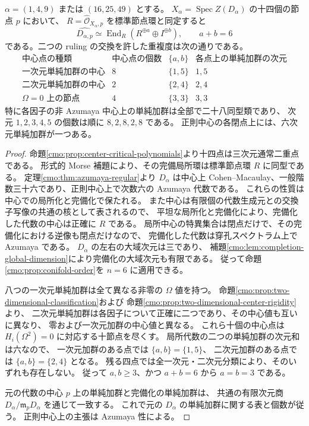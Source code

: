 \begin{theorem}
\label{cmo:thm:fourteen-node-orders}
$\alpha=(1,4,9)$ または $(16,25,49)$ とする。
$X_\alpha=\operatorname{Spec}Z(D_\alpha)$ の十四個の節点 $p$ において、
$R=\widehat{\mathcal O}_{X_\alpha,p}$ を標準節点環と同定すると
\[
 \widehat{D_{\alpha,p}}
 \simeq\operatorname{End}_R(R^{\oplus a}\oplus I^{\oplus b}),\qquad a+b=6
\]
である。二つの ruling の交換を許した重複度は次の通りである。
\[
\begin{array}{c|c|c|c}
 \text{中心点の種類}&\text{中心点の個数}&\{a,b\}
 &\text{各点上の単純加群の次元}\\\hline
 \text{一次元単純加群の中心}&8&\{1,5\}&1,5\\
 \text{二次元単純加群の中心}&2&\{2,4\}&2,4\\
 \Omega=0\text{ 上の節点}&4&\{3,3\}&3,3
\end{array}
\]
特に各因子の非 Azumaya 中心上の単純加群は全部で二十八同型類であり、
次元 $1,2,3,4,5$ の個数は順に $8,2,8,2,8$ である。
正則中心の各閉点上には、六次元単純加群が一つある。
\end{theorem}

\begin{proof}
命題\ref{cmo:prop:center-critical-polynomials}より十四点は三次元通常二重点である。
形式的 Morse 補題により、その完備局所環は標準節点環 $R$ に同型である。
定理\ref{cmo:thm:azumaya-regular}より $D_\alpha$ は中心上
Cohen--Macaulay、一般階数三十六であり、正則中心上で次数六の Azumaya 代数である。
これらの性質は中心での局所化と完備化で保たれる。
また中心は有限個の代数生成元との交換子写像の共通の核として表されるので、
平坦な局所化と完備化により、完備化した代数の中心は正確に $R$ である。
局所中心の特異集合は閉点だけで、その完備化における逆像も閉点だけなので、
完備化した代数は穿孔スペクトラム上で Azumaya である。
$D_\alpha$ の左右の大域次元は三であり、
補題\ref{cmo:lem:completion-global-dimension}により完備化の大域次元も有限である。
従って命題\ref{cmo:prop:conifold-order}を $n=6$ に適用できる。

八つの一次元単純加群は全て異なる非零の $\Omega$ 値を持つ。
命題\ref{cmo:prop:two-dimensional-classification}および
命題\ref{cmo:prop:two-dimensional-center-rigidity}より、
二次元単純加群は各因子について正確に二つであり、その中心値も互いに異なり、
零および一次元加群の中心値と異なる。
これら十個の中心点は $H_i(\Omega^2)=0$ に対応する十節点を尽くす。
局所代数の二つの単純加群の次元和は六なので、
一次元加群のある点では $\{a,b\}=\{1,5\}$、
二次元加群のある点では $\{a,b\}=\{2,4\}$ となる。
残る四点では全一次元・二次元分類により、そのいずれも存在しない。
従って $a,b\ge3$、かつ $a+b=6$ から $a=b=3$ である。

元の代数の中心 $p$ 上の単純加群と完備化の単純加群は、
共通の有限次元商 $D_\alpha/\mathfrak m_pD_\alpha$ を通じて一致する。
これで元の $D_\alpha$ の単純加群に関する表と個数が従う。
正則中心上の主張は Azumaya 性による。
\end{proof}

